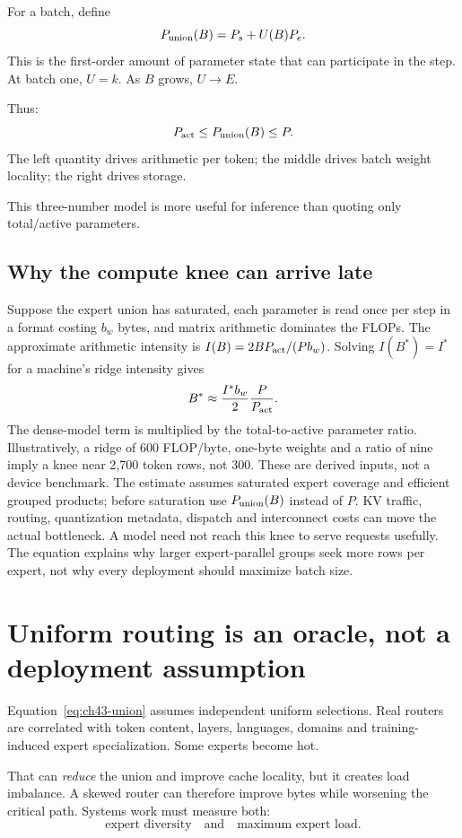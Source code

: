 For a batch, define
\[
P_{\rm union}(B)=P_s+U(B)P_e.
\]
This is the first-order amount of parameter state that can participate in the step.
At batch one, $U=k$. As $B$ grows, $U\to E$.

Thus:
\[
P_{\rm act}\le P_{\rm union}(B)\le P.
\]
The left quantity drives arithmetic per token; the middle drives batch weight locality;
the right drives storage.

This three-number model is more useful for inference than quoting only total/active
parameters.

\subsection{Why the compute knee can arrive late}

Suppose the expert union has saturated, each parameter is read once per
step in a format costing $b_w$ bytes, and matrix arithmetic dominates the
FLOPs. The approximate arithmetic intensity is
$I(B)=2BP_{\rm act}/(Pb_w)$. Solving $I(B^*)=I^*$ for a machine's
ridge intensity gives
\begin{equation}
B^*\approx\frac{I^*b_w}{2}\frac{P}{P_{\rm act}}.
\label{eq:moe-ridge-batch}
\end{equation}
The dense-model term is multiplied by the total-to-active parameter ratio.
Illustratively, a ridge of 600 FLOP/byte, one-byte weights and a ratio of
nine imply a knee near 2,700 token rows, not 300. These are derived inputs,
not a device benchmark. The estimate assumes saturated expert coverage and
efficient grouped products; before saturation use $P_{\rm union}(B)$
instead of $P$. KV traffic, routing, quantization metadata, dispatch and
interconnect costs can move the actual bottleneck. A model need not reach
this knee to serve requests usefully. The equation explains why larger
expert-parallel groups seek more rows per expert, not why every deployment
should maximize batch size.

\section{Uniform routing is an oracle, not a deployment assumption}

Equation~\eqref{eq:ch43-union} assumes independent uniform selections. Real routers are
correlated with token content, layers, languages, domains and training-induced expert
specialization. Some experts become hot.

That can \emph{reduce} the union and improve cache locality, but it creates load
imbalance. A skewed router can therefore improve bytes while worsening the critical
path. Systems work must measure both:
\[
\text{expert diversity}
\quad\text{and}\quad
\text{maximum expert load}.
\]

